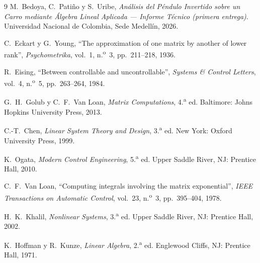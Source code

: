 \documentclass[11pt,letterpaper]{article}
\theoremstyle{definition}
\theoremstyle{plain}
\theoremstyle{remark}
\begin{document}
\begin{thebibliography}{9}
\small
{}
M.~Bedoya, C.~Patiño y S.~Uribe, \emph{Análisis del Péndulo Invertido sobre un
Carro mediante Álgebra Lineal Aplicada --- Informe Técnico (primera entrega)}.
Universidad Nacional de Colombia, Sede Medellín, 2026.

C.~Eckart y G.~Young, ``The approximation of one matrix by another of lower
rank'', \emph{Psychometrika}, vol.~1, n.\textsuperscript{o}~3, pp.~211--218, 1936.

R.~Eising, ``Between controllable and uncontrollable'', \emph{Systems \& Control
Letters}, vol.~4, n.\textsuperscript{o}~5, pp.~263--264, 1984.

G.~H.~Golub y C.~F.~Van Loan, \emph{Matrix Computations},
4.\textsuperscript{a} ed. Baltimore: Johns Hopkins University Press, 2013.

C.-T.~Chen, \emph{Linear System Theory and Design}, 3.\textsuperscript{a} ed.
New York: Oxford University Press, 1999.

K.~Ogata, \emph{Modern Control Engineering}, 5.\textsuperscript{a} ed.
Upper Saddle River, NJ: Prentice Hall, 2010.

C.~F.~Van Loan, ``Computing integrals involving the matrix exponential'',
\emph{IEEE Transactions on Automatic Control}, vol.~23,
n.\textsuperscript{o}~3, pp.~395--404, 1978.

H.~K.~Khalil, \emph{Nonlinear Systems}, 3.\textsuperscript{a} ed.
Upper Saddle River, NJ: Prentice Hall, 2002.

K.~Hoffman y R.~Kunze, \emph{Linear Algebra}, 2.\textsuperscript{a} ed.
Englewood Cliffs, NJ: Prentice Hall, 1971.

\end{thebibliography}
\end{document}
